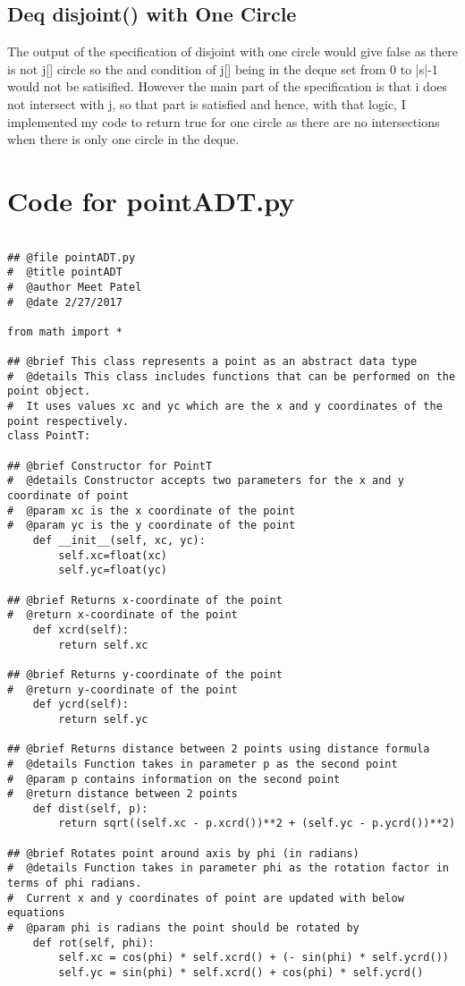 \documentclass[12pt]{article}
\begin{document}
\subsection{Deq disjoint() with One Circle}

The output of the specification of disjoint with one circle would give false as there is not j[] circle so the and condition of j[] being in the deque set from 0 to |s|-1 would not be satisified. However the main part of the specification is that i does not intersect with j, so that part is satisfied and hence, with that logic, I implemented my code to return true for one circle as there are no intersections when there is only one circle in the deque. 

\newpage

\lstset{language=Python, basicstyle=\tiny,breaklines=true,showspaces=false,showstringspaces=false,breakatwhitespace=true}
\def\thesection{\Alph{section}} 

\section{Code for pointADT.py} \label{MyPointSect}
\begin{lstlisting}

## @file pointADT.py
#  @title pointADT
#  @author Meet Patel
#  @date 2/27/2017

from math import *

## @brief This class represents a point as an abstract data type
#  @details This class includes functions that can be performed on the point object.
#  It uses values xc and yc which are the x and y coordinates of the point respectively.
class PointT:

## @brief Constructor for PointT
#  @details Constructor accepts two parameters for the x and y coordinate of point
#  @param xc is the x coordinate of the point
#  @param yc is the y coordinate of the point
    def __init__(self, xc, yc):
        self.xc=float(xc)
        self.yc=float(yc)
        
## @brief Returns x-coordinate of the point 
#  @return x-coordinate of the point
    def xcrd(self):
        return self.xc

## @brief Returns y-coordinate of the point 
#  @return y-coordinate of the point
    def ycrd(self):
        return self.yc
    
## @brief Returns distance between 2 points using distance formula
#  @details Function takes in parameter p as the second point
#  @param p contains information on the second point
#  @return distance between 2 points
    def dist(self, p):
        return sqrt((self.xc - p.xcrd())**2 + (self.yc - p.ycrd())**2)

## @brief Rotates point around axis by phi (in radians)
#  @details Function takes in parameter phi as the rotation factor in terms of phi radians.
#  Current x and y coordinates of point are updated with below equations
#  @param phi is radians the point should be rotated by
    def rot(self, phi):
        self.xc = cos(phi) * self.xcrd() + (- sin(phi) * self.ycrd())
        self.yc = sin(phi) * self.xcrd() + cos(phi) * self.ycrd()

\end{lstlisting}
\end{document}
